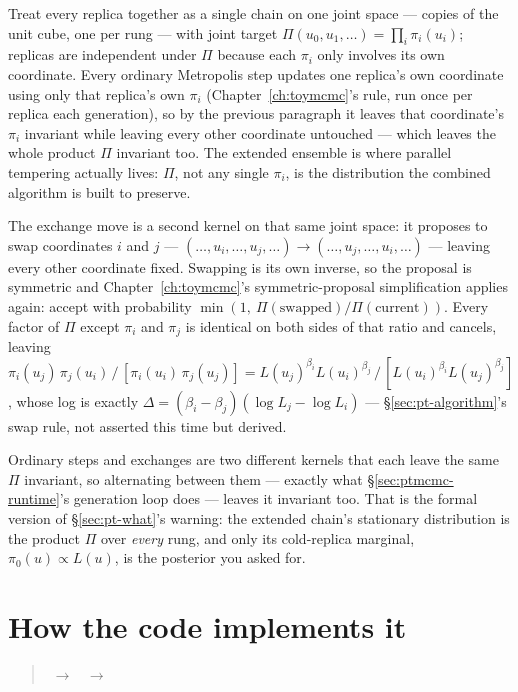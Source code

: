 Treat every replica together as a single chain on one joint space ---
 copies of the unit cube, one per rung --- with joint target
$\Pi(u_0, u_1, \ldots) = \prod_i \pi_i(u_i)$; replicas are independent under $\Pi$
because each $\pi_i$ only involves its own coordinate. Every ordinary Metropolis step
updates one replica's own coordinate using only that replica's own $\pi_i$
(Chapter~\ref{ch:toymcmc}'s rule, run once per replica each generation), so by the
previous paragraph it leaves that coordinate's $\pi_i$ invariant while leaving every
other coordinate untouched --- which leaves the whole product $\Pi$ invariant too.
The extended ensemble is where parallel tempering actually lives: $\Pi$, not any
single $\pi_i$, is the distribution the combined algorithm is built to
preserve\cite{EarlDeem:2005}.

The exchange move is a second kernel on that same joint space: it proposes to swap
coordinates $i$ and $j$ --- $(\ldots, u_i, \ldots, u_j, \ldots) \to (\ldots, u_j,
\ldots, u_i, \ldots)$ --- leaving every other coordinate fixed. Swapping is its own
inverse, so the proposal is symmetric and Chapter~\ref{ch:toymcmc}'s
symmetric-proposal simplification applies again: accept with probability
$\min(1,\ \Pi(\text{swapped})/\Pi(\text{current}))$. Every factor of $\Pi$ except
$\pi_i$ and $\pi_j$ is identical on both sides of that ratio and cancels, leaving
$\pi_i(u_j)\,\pi_j(u_i)\,/\,[\pi_i(u_i)\,\pi_j(u_j)] =
L(u_j)^{\beta_i}L(u_i)^{\beta_j}\,/\,[L(u_i)^{\beta_i}L(u_j)^{\beta_j}]$, whose log is
exactly $\Delta = (\beta_i-\beta_j)(\log L_j - \log L_i)$ ---
\S\ref{sec:pt-algorithm}'s swap rule, not asserted this time but
derived\cite{Geyer:1991,HukushimaNemoto:1996}.

Ordinary steps and exchanges are two different kernels that each leave the same
$\Pi$ invariant, so alternating between them --- exactly what
\S\ref{sec:ptmcmc-runtime}'s generation loop does --- leaves it invariant too. That
is the formal version of \S\ref{sec:pt-what}'s warning: the extended chain's
stationary distribution is the product $\Pi$ over \emph{every} rung, and only its
cold-replica marginal, $\pi_0(u) \propto L(u)$, is the posterior you asked for.

\section{How the code implements it}
\label{sec:ptmcmc-classes}

\begin{quote}
\sffamily\footnotesize
{} $\;\to\;$  $\;\to\;$ 
\end{quote}

